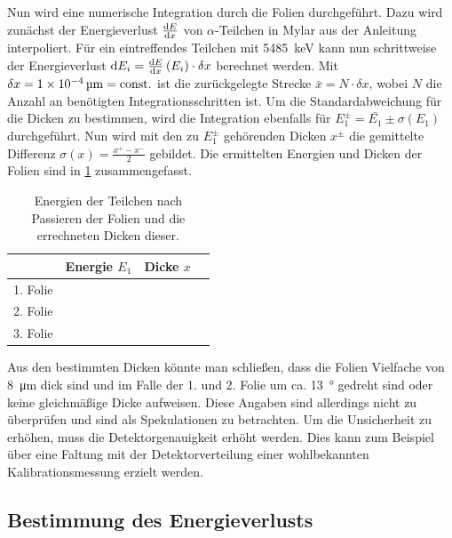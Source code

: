Nun wird eine numerische Integration durch die Folien durchgeführt.
Dazu wird zunächst der Energieverlust $\dv{E}{x}$ von $\alpha$-Teilchen in Mylar aus der Anleitung interpoliert.
Für ein eintreffendes Teilchen mit \SI{5485}{\kilo\electronvolt} kann nun schrittweise der Energieverlust $\dd E_i = \dv{E}{x} \left(E_i\right) \cdot \delta x$ berechnet werden.
Mit $\delta x = \SI{1e-4}{\micro\meter} = \text{const.}$ ist die zurückgelegte Strecke $\bar{x} = N \cdot \delta x$, wobei $N$ die Anzahl an benötigten Integrationsschritten ist.
Um die Standardabweichung für die Dicken zu bestimmen, wird die Integration ebenfalls für $E_1^\pm = \bar{E_1} \pm \sigma(E_1)$ durchgeführt.
Nun wird mit den zu $E_1^\pm$ gehörenden Dicken $x^\pm$ die gemittelte Differenz $\sigma(x) = \frac{x^+ - x^-}{2}$ gebildet.
Die ermittelten Energien und Dicken der Folien sind in \cref{tab:dicken} zusammengefasst.

\begin{table}[ht]
	\centering
	\caption{Energien der Teilchen nach Passieren der Folien und die errechneten Dicken dieser.} 
	\label{tab:dicken}
	\begin{tabular}{c|ccc}
		\toprule
		         &          Energie $E_1$          &           Dicke $x$           &  \\ \midrule
		1. Folie &  &  &  \\
		2. Folie &  &  &  \\
		3. Folie &  &  &  \\ \bottomrule
	\end{tabular}
\end{table}

Aus den bestimmten Dicken könnte man schließen, dass die Folien Vielfache von \SI{8}{\micro\meter} dick sind und im Falle der 1. und 2. Folie um ca. \SI{13}{\degree} gedreht sind oder keine gleichmäßige Dicke aufweisen.
Diese Angaben sind allerdings nicht zu überprüfen und sind als Spekulationen zu betrachten.
Um die Unsicherheit zu erhöhen, muss die Detektorgenauigkeit erhöht werden.
Dies kann zum Beispiel über eine Faltung mit der Detektorverteilung einer wohlbekannten Kalibrationsmessung erzielt werden.

\subsection{Bestimmung des Energieverlusts}

